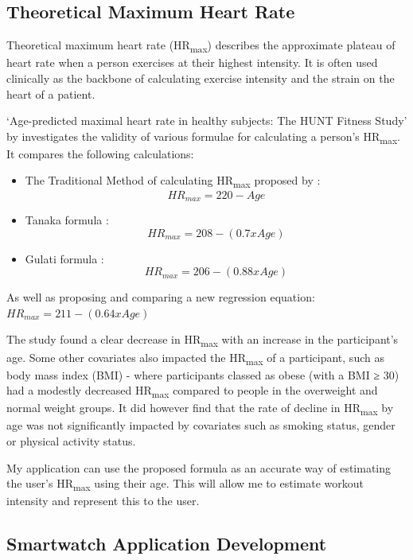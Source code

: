 \documentclass{l4proj}
\begin{document}
\subsection{Theoretical Maximum Heart Rate}
\label{sec:backgroundmaxhr}

Theoretical maximum heart rate (HR\textsubscript{max}) describes the approximate plateau of heart rate when a person exercises at their highest intensity. It is often used clinically as the backbone of calculating exercise intensity and the strain on the heart of a patient. 

‘Age-predicted maximal heart rate in healthy subjects: The HUNT Fitness Study’ by \cite{NesHRmax} investigates the validity of various formulae for calculating a person’s HR\textsubscript{max}. It compares the following calculations:

\begin{itemize}
    \item The Traditional Method of calculating HR\textsubscript{max} proposed by \cite{foxHRmax}: $$HR_{max} = 220 - Age$$
    \item Tanaka formula \cite{TANAKAHRmax}: $$HR_{max} = 208 - (0.7 x Age)$$
    \item Gulati formula \cite{GulatiHRmax}: $$HR_{max} = 206 - (0.88 x Age)$$
\end{itemize}

As well as proposing and comparing a new regression equation: $HR_{max} = 211 - (0.64 x Age)$

The study found a clear decrease in HR\textsubscript{max} with an increase in the participant’s age. Some other covariates also impacted the HR\textsubscript{max} of a participant, such as body mass index (BMI) - where participants classed as obese (with a BMI ≥ 30) had a modestly decreased HR\textsubscript{max} compared to people in the overweight and normal weight groups. It did however find that the rate of decline in HR\textsubscript{max} by age was not significantly impacted by covariates such as smoking status, gender or physical activity status.

My application can use the proposed formula as an accurate way of estimating the user's HR\textsubscript{max} using their age. This will allow me to estimate workout intensity and represent this to the user.


\subsection{Smartwatch Application Development}
\label{sec:backgroundwatchdev}
\end{document}
